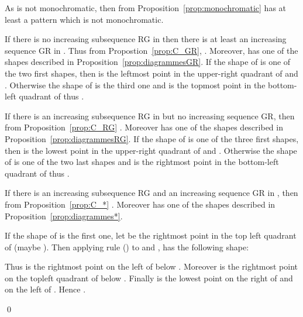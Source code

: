 \documentclass[11pt]{article}
\newenvironment{pf}{{\em \noindent Proof:}}{ \hfill \qed\smallskip}
\newcommand{\rmnum}[1]{\romannumeral #1}
\newcommand{\Vpoint}[2]{\draw (#1,#2) [darkgreen,fill=darkgreen] circle (3pt);}
\newcommand{\Hpoint}[2]{\draw (#1,#2) [darkred,fill=darkred] circle (3pt);}
\newcommand{\zoneRG}[3]{
\draw [very thick,H,Hpoint] (#1,#2) -- +(-#3,0);
\draw [very thick,V,Vpoint] (#1,#2) -- +(0,#3);
\draw [Hfill] (#1,#2) -- +(-#3,#3) -- +(-#3,0);
\draw [Vfill] (#1,#2) -- +(-#3,#3) -- + (0,#3);
}
\newcommand{\zoneGR}[3]{
\draw [very thick,H,Hpoint] (#1,#2) -- +(-#3,0);
\draw [very thick,V,Vpoint] (#1,#2) -- +(0,#3);
\draw [Vfill] (#1,#2) -- +(-#3,#3) -- +(-#3,0);
\draw [Hfill] (#1,#2) -- +(-#3,#3) -- + (0,#3);
}
\begin{document}
\begin{pf}
As  is not monochromatic, then from Proposition~\ref{prop:monochromatic}  has at least a pattern  which is not monochromatic.

If there is no increasing subsequence RG in  then there is at least an increasing sequence GR in . 
Thus from Propostion~\ref{prop:C_GR}, . 
Moreover,  has one of the  shapes described in Proposition~\ref{prop:diagrammesGR}.
If the shape of  is one of the two first shapes, then  is the leftmost point in the upper-right quadrant of 
and .
Otherwise the shape of  is the third one and  is the topmost point in the bottom-left quadrant of 
thus .

If there is an increasing subsequence RG in  but no increasing sequence GR, 
then from Proposition~\ref{prop:C_RG} .
Moreover  has one of the  shapes described in Proposition~\ref{prop:diagrammesRG}.
If the shape of  is one of the three first shapes, then  is the lowest point in the upper-right quadrant of 
and .
Otherwise the shape of  is one of the two last shapes and  is the rightmost point in the bottom-left quadrant of 
thus .

If there is an increasing subsequence RG and an increasing sequence GR in , 
then from Proposition~\ref{prop:C_*} .
Moreover  has one of the  shapes described in Proposition~\ref{prop:diagrammes*}.

If the shape of  is the first one, let  be the rightmost point in the top left quadrant of  (maybe ).
Then applying rule (\rmnum{2}) to  and ,  has the following shape:

\begin{minipage}{.2\textwidth}
\end{minipage}
\begin{minipage}{.75\textwidth}
Thus  is the rightmost point on the left of  below . 
Moreover  is the rightmost point on the topleft quadrant of  below .
Finally  is the lowest point on the right of  and on the left of .
Hence .
\end{minipage}


\end{pf}
\end{document}
